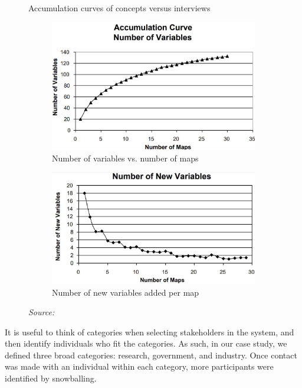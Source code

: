 \begin{figure}[h]
\caption{Accumulation curves of concepts versus interviews} \label{accumFCM}
\begin{subfigure}[b]{0.45\textwidth}
  \centering
  \includegraphics[width=\textwidth]{fig/numVars.jpg}
\caption{Number of variables vs. number of maps} 
  \label{accumFCM:sub1}
\end{subfigure}%
  \hfill
\begin{subfigure}[b]{0.45\textwidth}
  \centering
  \includegraphics[width=\textwidth]{fig/newVars.jpg}
\caption{Number of new variables added per map}    
  \label{accumFCM:sub2}
\end{subfigure}
\caption*{\textit{Source:} \cite{ozesmi2004ecological}}
\end{figure}

It is useful to think of categories when selecting stakeholders in the system, and then identify individuals who fit the categories. As such, in our case study, we defined three broad categories: research, government, and industry. Once contact was made with an individual within each category, more participants were identified by snowballing. 

